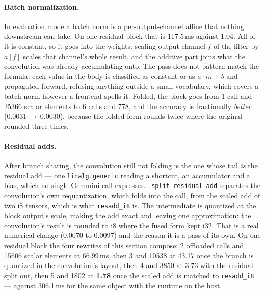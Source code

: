 \documentclass[runningheads]{llncs}
\begin{document}
\paragraph{Batch normalization.} In evaluation mode a batch norm \cite{batchnorm}
is a per-output-channel affine that nothing downstream can take. On one residual
block that is 117.5\,ms against 1.04. All of it is constant, so it goes into the
weights: scaling output channel $f$ of the filter by $a[f]$ scales that channel's
whole result, and the additive part joins what the convolution was already
accumulating onto. The pass does not pattern-match the formula: each value in the body is
classified as constant or as $a\cdot\mathit{in}+b$ and propagated forward,
refusing anything outside a small vocabulary, which covers a batch norm however
a frontend spells it. Folded, the
block goes from 1 call and 25366 scalar elements to 6 calls and 778, and the
accuracy is fractionally \emph{better} (0.0031\,$\to$\,0.0030), because the folded
form rounds twice where the original rounded three times.

\paragraph{Residual adds.} After branch sharing, the convolution still not folding
is the one whose tail \emph{is} the residual add --- one \texttt{linalg.generic}
reading a shortcut, an accumulator and a bias, which no single Gemmini call
expresses. \texttt{--split-residual-add} separates the convolution's own
requantization, which folds into the call, from the scaled add of two i8 tensors,
which is what \texttt{resadd\_i8} is. The intermediate is quantized at the block output's scale,
making the add exact and leaving one approximation: the convolution's result is
rounded to i8 where the fused form kept i32. That is a real numerical change
(0.0070 to 0.0097) and the reason it is a pass of its own. On one residual block
the four rewrites of this section compose: 2 offloaded calls and 15606 scalar
elements at 66.99\,ms, then 3 and 10538 at 43.17 once the branch is quantized in
the convolution's layout, then 4 and 3850 at 3.73 with the residual split out, then
5 and 1802 at \textbf{1.78} once the scaled add is matched to \texttt{resadd\_i8}
--- against 306.1\,ms for the same object with the runtime on the host.
\end{document}
